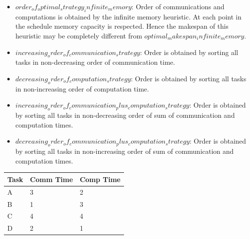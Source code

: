 \documentclass[runningheads]{llncs} %
\begin{document}
\begin{itemize}[a)]
	\item $order_of_optimal_strategy_infinite_memory $: Order of communications and computations is obtained by the infinite memory heuristic. At each point in the schedule memory capacity is respected. Hence the makespan of this heuristic may be completely different from $optimal_makespan_infinite_memory$.
	
	\item $increasing_order_of_communication_strategy$: Order is obtained by sorting all tasks in non-decreasing order of communication time. 
	
	\item $decreasing_order_of_computation_strategy$: Order is obtained by sorting all tasks in non-increasing order of computation time. 
	\item $increasing_order_of_communication_plus_computation_strategy$: Order is obtained by sorting all tasks in non-decreasing order of sum of communication and computation times.
	\item $decreasing_order_of_communication_plus_computation_strategy$: Order is obtained by sorting all tasks in non-increasing order of sum of communication and computation times.
	
\end{itemize}
\begin{tabular}{|l|l|l|}
\hline
Task & Comm Time & Comp Time\\ \hline
A & 3 & 2\\ \hline
B & 1 & 3\\ \hline
C & 4 & 4\\ \hline
D & 2 & 1\\ \hline
\end{tabular}
\end{document}

